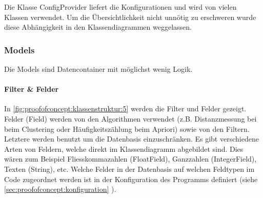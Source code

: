 Die Klasse ConfigProvider liefert die Konfigurationen und wird von vielen Klassen verwendet. Um die Übersichtlichkeit nicht unnötig zu erschweren wurde diese Abhängigkeit in den Klassendiagrammen weggelassen. 

\subsubsection{Models}
\label{sec:proofofconcept:klassenstruktur:models}
Die Models sind Datencontainer mit möglichst wenig Logik. 

\paragraph{Filter \& Felder} In \cref{fig:proofofconcept:klassenstruktur:5} werden die Filter und Felder gezeigt. Felder (Field) werden von den Algorithmen verwendet (z.B. Distanzmessung bei beim Clustering oder Häufigkeitszählung beim Apriori) sowie von den Filtern. Letztere werden benutzt um die Datenbasis einzuschränken. Es gibt verschiedene Arten von Feldern, welche direkt im Klassendiagramm abgebildet sind. Dies wären zum Beispiel Fliesskommazahlen (FloatField), Ganzzahlen (IntegerField), Texten (String), etc. Welche Felder in der Datenbasis auf welchen Feldtypen im Code zugeordnet werden ist in der Konfiguration des Programms definiert (siehe \cref{sec:proofofconcept:konfiguration} ).

